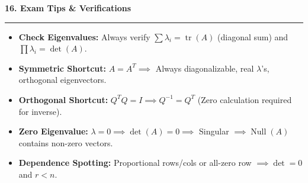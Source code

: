 \documentclass[10pt, landscape, twocolumn]{article}
\newcommand{\cheatsheetsection}[1]{
    \vspace{0.6em}
    {\color{themeblue}\large\bfseries #1} \par
    \vspace{-0.5em}
    {\color{themeblue}\rule{\linewidth}{1pt}} \par
    \vspace{0.2em}
}
\begin{document}
\cheatsheetsection{16. Exam Tips \& Verifications}
\begin{itemize}[leftmargin=*, itemsep=4pt, parsep=0pt]
    \item \textbf{Check Eigenvalues:} Always verify $\sum \lambda_i = \operatorname{tr}(A)$ (diagonal sum) and $\prod \lambda_i = \det(A)$.
    \item \textbf{Symmetric Shortcut:} $A = A^T \implies$ Always diagonalizable, real $\lambda$'s, orthogonal eigenvectors.
    \item \textbf{Orthogonal Shortcut:} $Q^T Q = I \implies Q^{-1} = Q^T$ (Zero calculation required for inverse).
    \item \textbf{Zero Eigenvalue:} $\lambda=0 \implies \det(A)=0 \implies$ Singular $\implies \operatorname{Null}(A)$ contains non-zero vectors.
    \item \textbf{Dependence Spotting:} Proportional rows/cols or all-zero row $\implies \det=0$ and $r<n$.
\end{itemize}
\end{document}
